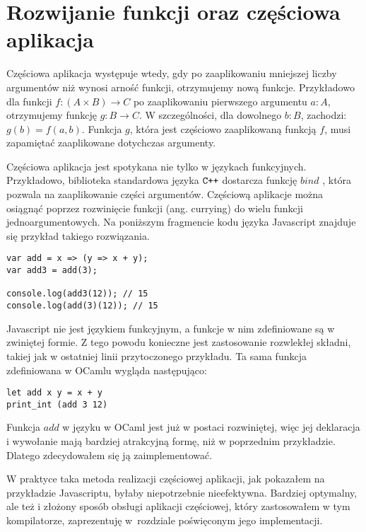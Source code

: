 \documentclass[declaration,shortabstract]{iithesis}
\begin{document}

\section{Rozwijanie funkcji oraz częściowa aplikacja}

Częściowa aplikacja występuje wtedy, gdy po zaaplikowaniu mniejszej liczby 
argumentów niż wynosi arność funkcji, otrzymujemy nową funkcje. Przykładowo 
dla funkcji $f: (A \times B) \rightarrow C$ po zaaplikowaniu pierwszego 
argumentu $a : A$, otrzymujemy funkcję $g : B \rightarrow C$. W szczególności,
dla dowolnego $b : B$, zachodzi: $g(b) = f(a, b)$. Funkcja $g$, która jest 
częściowo zaaplikowaną funkcją $f$, musi zapamiętać zaaplikowane dotychczas 
argumenty. 

Częściowa aplikacja jest spotykana nie tylko w językach funkcyjnych. 
Przykładowo, biblioteka standardowa języka $\verb!C++!$ dostarcza funkcję
$bind$ \cite{cpp_bind}, która pozwala na zaaplikowanie części argumentów. 
Częściową aplikacje można osiągnąć poprzez rozwinięcie funkcji (ang. currying) 
do wielu funkcji jednoargumentowych. Na poniższym fragmencie kodu języka 
Javascript znajduje się przykład takiego rozwiązania.

\begin{lstlisting}[frame=single, caption=Rozwinięcie funkcji w Javascriptcie.]
var add = x => (y => x + y);
var add3 = add(3);

console.log(add3(12)); // 15
console.log(add(3)(12)); // 15
\end{lstlisting}

Javascript nie jest językiem funkcyjnym, a funkcje w nim zdefiniowane są w 
zwiniętej formie. Z tego powodu konieczne jest zastosowanie rozwlekłej składni, 
takiej jak w ostatniej linii przytoczonego przykładu. Ta sama funkcja 
zdefiniowana w OCamlu wygląda następująco:

\begin{lstlisting}[frame=single, caption=Rozwinięta funkcja w OCamlu.]
let add x y = x + y 
print_int (add 3 12)
\end{lstlisting}

Funkcja $add$ w języku w OCaml jest już w postaci rozwiniętej, więc jej 
deklaracja i wywołanie mają bardziej atrakcyjną formę, niż w poprzednim 
przykładzie. Dlatego zdecydowałem się ją zaimplementować.

W praktyce taka metoda realizacji częściowej aplikacji, jak pokazałem na 
przykładzie Javascriptu, byłaby niepotrzebnie nieefektywna. Bardziej optymalny,
ale też i złożony sposób obsługi aplikacji częściowej, który zastosowałem w tym 
kompilatorze, zaprezentuję w~rozdziale poświęconym jego implementacji.
\end{document}
